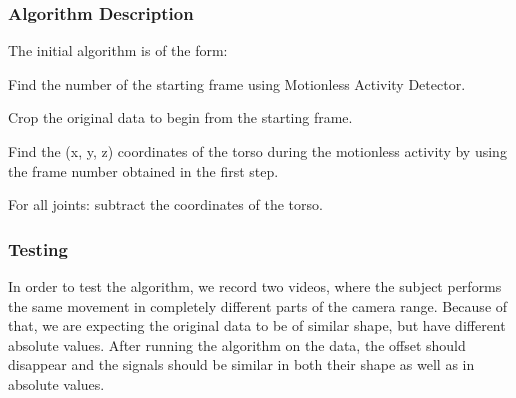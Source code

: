 \documentclass[11pt,a4paper]{article}
\begin{document}
\subsubsection{Algorithm Description}
\noindent
The initial algorithm is of the form:
\begin{compactitem}
\setlength{\itemsep}{1pt}
\setlength{\parskip}{0pt}
\setlength{\parsep}{0pt}
	\item Find the number of the starting frame using Motionless Activity Detector.
	\item Crop the original data to begin from the starting frame.
	\item Find the (x, y, z) coordinates of the torso during the motionless activity by using the frame number obtained in the first step.
	\item For all joints: subtract the coordinates of the torso.
\end{compactitem}

\subsubsection{Testing}
\noindent
In order to test the algorithm, we record two videos, where the subject performs the same movement in completely different parts of the camera range. Because of that, we are expecting the original data to be of similar shape, but have different absolute values. After running the algorithm on the data, the offset should disappear and the signals should be similar in both their shape as well as in absolute values.
\end{document}
